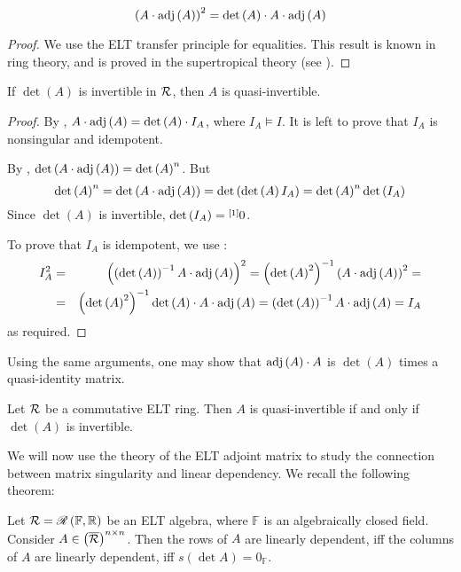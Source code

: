\begin{cor}\label{cor:A-times-adj-squared}
$$\left(A\cdot\textnormal{adj}\left(A\right)\right)^2=\det\left(A\right)\cdot A\cdot\textnormal{adj}\left(A\right)$$
\end{cor}
\begin{proof}
We use the ELT transfer principle for equalities. This result is known in ring theory, and is proved in the supertropical theory (see \cite[Theorem~4.12]{IR3}).
\end{proof}

\begin{thm}\label{thm:det-inv-then-A-quasinv}
If $\det\left(A\right)$ is invertible in $\mathcal{R}$, then $A$ is quasi-invertible.
\end{thm}
\begin{proof}
By , $A\cdot\textnormal{adj}\left(A\right)=\det\left(A\right)\cdot I_{A}$, where $I_{A}\vDash I$. It is left to prove that $I_A$ is nonsingular and idempotent.

By , $\det\left(A\cdot\textnormal{adj}\left(A\right)\right)=\det\left(A\right)^n$. But
$$\det\left(A\right)^n=\det\left(A\cdot\textnormal{adj}\left(A\right)\right)=\det\left(\det\left(A\right)I_A\right)=\det\left(A\right)^n\det\left(I_A\right)$$
Since $\det\left(A\right)$ is invertible, $\det\left(I_A\right)=\overset{\left[1\right]}{}0$.

To prove that $I_A$ is idempotent, we use :
\begin{eqnarray*}
I_A^2&=&\left(\left(\det\left(A\right)\right)^{-1}A\cdot\textnormal{adj}\left(A\right)\right)^2= \left(\det\left(A\right)^2\right)^{-1}\left(A\cdot\textnormal{adj}\left(A\right)\right)^2=\\ &=&\left(\det\left(A\right)^2\right)^{-1}\det\left(A\right)\cdot A\cdot\textnormal{adj}\left(A\right)=\left(\det\left(A\right)\right)^{-1}A\cdot\textnormal{adj}\left(A\right)=I_A
\end{eqnarray*}
as required.
\end{proof}

\begin{rem}
Using the same arguments, one may show that $\textnormal{adj}\left(A\right)\cdot A$ is $\det\left(A\right)$ times a quasi-identity matrix.
\end{rem}

\begin{cor}\label{cor:quasi-invertible-mat}
Let $\mathcal{R}$ be a commutative ELT ring. Then $A$ is quasi-invertible if and only if $\det\left(A\right)$ is invertible.
\end{cor}

We will now use the theory of the ELT adjoint matrix to study the connection between matrix singularity and linear dependency. We recall the following theorem:
\begin{thm*}[{\cite[Theorem 1.6]{BS}}]
Let $\mathcal{R}=\mathscr{R}\left(\mathbb{F},\mathbb{R}\right)$ be an ELT algebra, where $\mathbb{F}$ is an algebraically closed field. Consider $A\in\left(\overline{\mathcal{R}}\right)^{n\times n}$. Then the rows of $A$ are linearly dependent, iff the columns of $A$ are linearly dependent, iff $s\left(\det A\right)=0_\mathbb{F}$.
\end{thm*}

